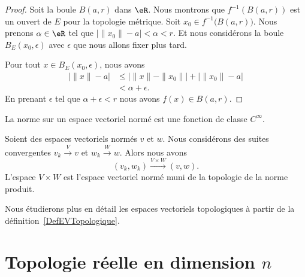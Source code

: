 \begin{proof}
	Soit la boule \( B(a,r)\) dans \( \eR\). Nous montrons que \( f^{-1}(B(a,r))\) est un ouvert de \( E\) pour la topologie métrique. Soit \( x_0\in f^{-1}\big( B(a,r) \big)\). Nous prenons \( \alpha\in \eR\) tel que \( \big| \| x_0 \|-a \big|<\alpha<r\). Et nous considérons la boule \( B_E(x_0,\epsilon)\) avec \( \epsilon\) que nous allons fixer plus tard.

	Pour tout \( x\in B_E(x_0,\epsilon)\), nous avons
	\begin{subequations}
		\begin{align}
			\big| \| x \|-a \big| & \leq\big| \| x \|-\| x_0 \| \big|+\big| \| x_0 \|-a \big| \\
			                      & <\alpha+\epsilon.
		\end{align}
	\end{subequations}
	En prenant \( \epsilon\) tel que \( \alpha+\epsilon<r\) nous avons \( f(x)\in B(a,r)\).
\end{proof}

\begin{proposition}     \label{PROPooQUAZooGXskwF}
	La norme sur un espace vectoriel normé est une fonction de classe \(  C^{\infty}\).
\end{proposition}




\begin{proposition}	\label{PROPooMHAVooRgJjMB}
	Soient des espaces vectoriels normés \( v\) et \( w\). Nous considérons des suites convergentes \( v_k\stackrel{ V}{\longrightarrow} v\) et \( w_k\stackrel{ W}{\longrightarrow} w\). Alors nous avons
	\begin{equation}
		(v_k,w_k)\stackrel{ V\times W}{\longrightarrow} (v,w).
	\end{equation}
	L'espace \( V\times W\) est l'espace vectoriel normé muni de la topologie de la norme produit.
\end{proposition}


Nous étudierons plus en détail les espaces vectoriels topologiques à partir de la définition~\ref{DefEVTopologique}.


\section{Topologie réelle en dimension \( n\)}

